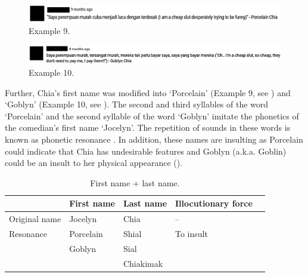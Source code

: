 \documentclass[english]{textolivre}
\begin{document}
\begin{figure}[h!]
    \centering
    \begin{minipage}{0.90\linewidth}
    \includegraphics[width=\linewidth]{imagens/exemplo9.png}
    \caption{Example 9.}\label{example-9}
    \end{minipage}
\end{figure}

\begin{figure}[h!]
    \centering
    \begin{minipage}{0.90\linewidth}
    \includegraphics[width=\linewidth]{imagens/exemplo10.png}
    \caption{Example 10.}\label{example-10}
    \end{minipage}
\end{figure}

Further, Chia’s first name was modified into ‘Porcelain’ (Example 9, see ) and ‘Goblyn’ (Example 10, see ). The second and third syllables of the word ‘Porcelain’ and the second syllable of the word ‘Goblyn’ imitate the phonetics of the comedian’s first name ‘Jocelyn’. The repetition of sounds in these words is known as phonetic resonance \cite{tantucci2022a}. In addition, these names are insulting as Porcelain could indicate that Chia has undesirable features and Goblyn (a.k.a. Goblin) could be an insult to her physical appearance ().

\begin{table}[h!]
\centering
\begin{threeparttable}
\caption{First name + last name.}\label{tab-4}
\begin{tabular}{lllll}
\toprule
& First name & Last name & Illocutionary force \\
\midrule
Original name & Jocelyn   & Chia  & --  &  \\
Resonance & Porcelain &  Shial  & To insult \\
& Goblyn & Sial & \\
& & Chiakimak & \\
\bottomrule
\end{tabular}
\end{threeparttable}
\end{table}
\end{document}
